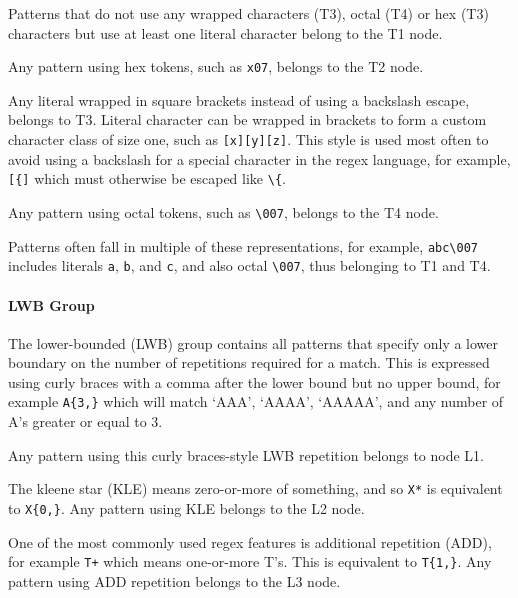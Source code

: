 

\begin{description}  \itemsep -1pt
\item[T1:] Patterns that do not use any wrapped characters (T3), octal (T4) or hex (T3) characters but use at least one literal character belong to the T1 node.
\item[T2:] Any pattern using hex tokens, such as \verb!x07!, belongs to the T2 node.
\item[T3:]  Any literal wrapped in square brackets instead of using a backslash escape, belongs to T3.
Literal character can be wrapped in brackets to form a custom character class of size one, such as \verb![x][y][z]!. This style is used most often to avoid using a backslash for a special character in the regex language, for example, \verb![{]! which must otherwise be escaped like \verb!\{!.

\item[T4:] Any pattern using octal tokens, such as \verb!\007!, belongs to the T4 node.
\end{description}

Patterns often fall in multiple of these representations, for example, \verb!abc\007! includes literals \verb!a!, \verb!b!, and \verb!c!, and also octal \verb!\007!, thus belonging to T1 and T4. 


\paragraph{LWB Group}
The lower-bounded (LWB) group contains all patterns that specify only a lower boundary on the number of repetitions required for a match.  This is expressed using curly braces with a comma after the lower bound but no upper bound, for example \verb!A{3,}! which will match `AAA', `AAAA', `AAAAA', and any number of A's greater or equal to 3.


\begin{description}  \itemsep -1pt
\item[L1:] Any pattern using this curly braces-style LWB repetition belongs to node L1.
\item[L2:] The kleene star (KLE) means zero-or-more of something, and so \verb!X*! is equivalent to \verb!X{0,}!.  Any pattern using KLE belongs to the L2 node.
\item[L3:] One of the most commonly used regex features is additional repetition (ADD), for example \verb!T+! which means one-or-more T's.  This is equivalent to \verb!T{1,}!.  Any pattern using ADD repetition belongs to the L3 node.
\end{description}

